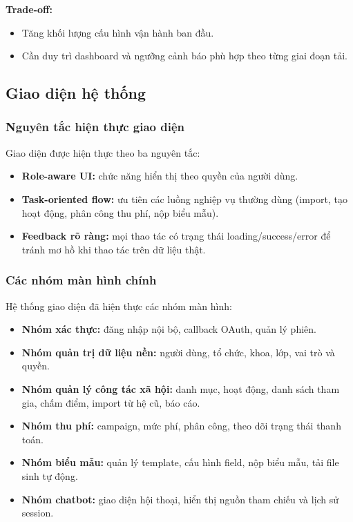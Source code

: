 \textbf{Trade-off:}
\begin{itemize}
	\item Tăng khối lượng cấu hình vận hành ban đầu.
	\item Cần duy trì dashboard và ngưỡng cảnh báo phù hợp theo từng giai đoạn tải.
\end{itemize}

\subsection{Giao diện hệ thống}

\subsubsection{Nguyên tắc hiện thực giao diện}
Giao diện được hiện thực theo ba nguyên tắc:
\begin{itemize}
	\item \textbf{Role-aware UI:} chức năng hiển thị theo quyền của người dùng.
	\item \textbf{Task-oriented flow:} ưu tiên các luồng nghiệp vụ thường dùng (import, tạo hoạt động, phân công thu phí, nộp biểu mẫu).
	\item \textbf{Feedback rõ ràng:} mọi thao tác có trạng thái loading/success/error để tránh mơ hồ khi thao tác trên dữ liệu thật.
\end{itemize}

\subsubsection{Các nhóm màn hình chính}
Hệ thống giao diện đã hiện thực các nhóm màn hình:
\begin{itemize}
	\item \textbf{Nhóm xác thực:} đăng nhập nội bộ, callback OAuth, quản lý phiên.
	\item \textbf{Nhóm quản trị dữ liệu nền:} người dùng, tổ chức, khoa, lớp, vai trò và quyền.
	\item \textbf{Nhóm quản lý công tác xã hội:} danh mục, hoạt động, danh sách tham gia, chấm điểm, import từ hệ cũ, báo cáo.
	\item \textbf{Nhóm thu phí:} campaign, mức phí, phân công, theo dõi trạng thái thanh toán.
	\item \textbf{Nhóm biểu mẫu:} quản lý template, cấu hình field, nộp biểu mẫu, tải file sinh tự động.
	\item \textbf{Nhóm chatbot:} giao diện hội thoại, hiển thị nguồn tham chiếu và lịch sử session.
\end{itemize}

